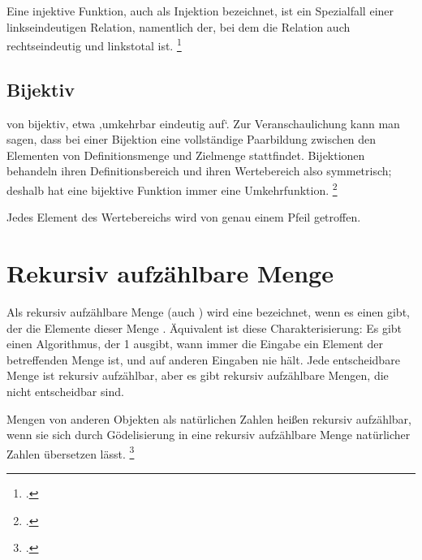 \documentclass{lehramt-informatik-haupt}
\begin{document}
Eine injektive Funktion, auch als Injektion bezeichnet, ist ein
Spezialfall einer linkseindeutigen Relation, namentlich der, bei dem die
Relation auch rechtseindeutig und linkstotal ist.
\footcite{wiki:injektiv}

%

\subsection{Bijektiv}

von bijektiv, etwa ‚umkehrbar eindeutig auf‘. Zur Veranschaulichung kann
man sagen, dass bei einer Bijektion eine vollständige Paarbildung
zwischen den Elementen von Definitionsmenge und Zielmenge stattfindet.
Bijektionen behandeln ihren Definitionsbereich und ihren Wertebereich
also symmetrisch; deshalb hat eine bijektive Funktion immer eine
Umkehrfunktion.
\footcite{wiki:bijektiv}

Jedes Element des Wertebereichs wird von genau einem Pfeil getroffen.

\begin{center}
\end{center}

\section{Rekursiv aufzählbare Menge}

Als rekursiv aufzählbare Menge (auch )
wird eine  bezeichnet, wenn es einen
 gibt, der die Elemente dieser Menge
. Äquivalent ist diese Charakterisierung: Es gibt einen
Algorithmus, der 1 ausgibt, wann immer die Eingabe ein Element der
betreffenden Menge ist, und auf anderen Eingaben nie hält. Jede
entscheidbare Menge ist rekursiv aufzählbar, aber es gibt rekursiv
aufzählbare Mengen, die nicht entscheidbar sind.

Mengen von anderen Objekten als natürlichen Zahlen heißen rekursiv
aufzählbar, wenn sie sich durch Gödelisierung in eine rekursiv
aufzählbare Menge natürlicher Zahlen übersetzen lässt.
\footcite{wiki:rekursiv-aufzaehlbar}

\literatur
\end{document}
